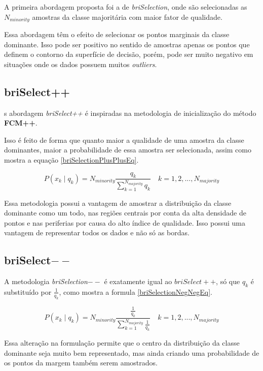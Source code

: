 \documentclass[]{article}
\begin{document}
	A primeira abordagem proposta foi a de \textit{briSelection}, onde são selecionadas as $N_{minority}$ amostras da classe majoritária com maior fator de qualidade. 
	
	Essa abordagem têm o efeito de selecionar os pontos marginais da classe dominante. Isso pode ser positivo no sentido de amostras apenas os pontos que definem o contorno da superfície de decisão, porém, pode ser muito negativo em situações onde os dados possuem muitos \textit{outliers}. 
	
	\subsection{briSelect++} 
	s abordagem \textit{briSelect++} é inspiradas na metodologia de inicialização do método \textbf{FCM++}.
	
	Isso é feito de forma que quanto maior a qualidade de uma amostra da classe dominantes, maior a probabilidade de essa amostra ser selecionada, assim como mostra a equação \ref{briSelectionPlusPlusEq}.
	
	\begin{equation}
	\label{briSelectionPlusPlusEq}
	P(x_k\mid q_k) = N_{minority} \frac{q_k}{\sum_{k = 1}^{N_{majority}} q_k}  \quad k = 1,2,...,N_{majority}
	\end{equation}
	
	Essa metodologia possui a vantagem de amostrar a distribuição da classe dominante como um todo, nas regiões centrais por conta da alta densidade de pontos e nas periferias por causa do alto índice de qualidade. Isso possui uma vantagem de representar todos os dados e não só as bordas.
	
	\subsection{briSelect$--$} 
	A metodologia \textit{briSelection$--$} é exatamente igual ao \textit{$briSelect++$}, só que $q_k$ é substituído por $\frac{1}{q_k}$, como mostra a formula \ref{briSelectionNegNegEq}.
	
		\begin{equation}
		\label{briSelectionNegNegEq}
		P(x_k\mid q_k) = N_{minority} \frac{\frac{1}{q_k}}{\sum_{k = 1}^{N_{majority}} \frac{1}{q_k}}  \quad k = 1,2,...,N_{majority}
		\end{equation}
		
	Essa alteração na formulação permite que o centro da distribuição da classe dominante seja muito bem representado, mas ainda criando uma probabilidade de os pontos da margem também serem amostrados.
	
\end{document}

